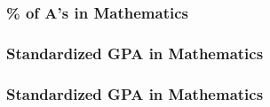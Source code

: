 \documentclass{beamer}
\begin{document}
\begin{frame}
    \label{update_scott}
    \frametitle{\% of A's in Mathematics}
        {
    }
\end{frame}

\begin{frame}
    \label{update_scott}
    \frametitle{Standardized GPA in Mathematics}
        {
    }
\end{frame}

\begin{frame}
    \label{update_scott}
    \frametitle{Standardized GPA in Mathematics}
        {
    }
\end{frame}
\end{document}
